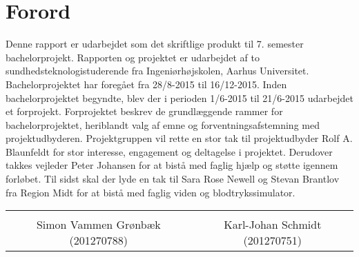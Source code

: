 \chapter*{Forord}

Denne rapport er udarbejdet som det skriftlige produkt til 7. semester bachelorprojekt. Rapporten og projektet er udarbejdet af to sundhedsteknologistuderende fra Ingeniørhøjskolen, Aarhus Universitet. Bachelorprojektet har foregået fra 28/8-2015 til 16/12-2015. Inden bachelorprojektet begyndte, blev der i perioden 1/6-2015 til 21/6-2015 udarbejdet et forprojekt. Forprojektet beskrev de grundlæggende rammer for bachelorprojektet, heriblandt valg af emne og forventningsafstemning med projektudbyderen. 
Projektgruppen vil rette en stor tak til projektudbyder Rolf A. Blaunfeldt for stor interesse, engagement og deltagelse i projektet. Derudover takkes vejleder Peter Johansen for at bistå med faglig hjælp og støtte igennem forløbet. Til sidst skal der lyde en tak til Sara Rose Newell og Stevan Brantlov fra Region Midt for at bistå med faglig viden og blodtrykssimulator. 

\vspace{3cm}

\begin{table}[H]
	\centering
	\begin{tabular}{c c}
		\underline{\phantom{mmmmmmmmmmmmmmmmmmmmm}} & \underline{\phantom{mmmmmmmmmmmmmmmmmmmmm}} \\
		Simon Vammen Grønbæk (201270788) \vspace{2cm} & Karl-Johan Schmidt (201270751) \vspace{2cm}\\
	\end{tabular}
\end{table}